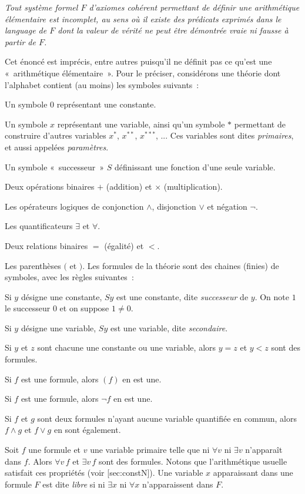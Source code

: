 \medskip

\noindent \emph{Tout système formel $F$ d'axiomes cohérent permettant de définir une arithmétique élémentaire est incomplet, au sens où il existe des prédicats exprimés dans le language de $F$ dont la valeur de vérité ne peut être démontrée vraie ni fausse à partir de $F$.}

\medskip

\noindent Cet énoncé est imprécis, entre autres puisqu'il ne définit pas ce qu'est une « arithmétique élémentaire ». 
Pour le préciser, considérons une théorie dont l'alphabet contient (au moins) les symboles suivants : 
\startitemize[nowhite]
  \item Un symbole $0$ représentant une constante. 
  \item Un symbole $x$ représentant une variable, ainsi qu'un symbole $\ast$ permettant de construire d'autres variables $x^\ast$, $x^{\ast\ast}$, $x^{\ast\ast\ast}$, ... Ces variables sont dites \emph{primaires}, et aussi appelées \emph{paramètres}.
  \item Un symbole « successeur » $S$ définissant une fonction d'une seule variable. 
  \item Deux opérations binaires $+$ (addition) et $\times$ (multiplication).
  \item Les opérateurs logiques de conjonction $\wedge$, disjonction $\vee$ et négation $\lnot$.
  \item Les quantificateurs $\exists$ et $\forall$. 
  \item Deux relations binaires $=$ (égalité) et $<$.
  \item Les parenthèses $($ et $)$.
\stopitemize
\blank[medium]
Les formules de la théorie sont des chaines (finies) de symboles, avec les règles suivantes : 
\startitemize[nowhite]
  \item Si $y$ désigne une constante, $S y$ est une constante, dite \emph{successeur} de $y$. 
      On note $1$ le successeur $0$ et on suppose $1 \neq 0$.
  \item Si $y$ désigne une variable, $S y$ est une variable, dite \emph{secondaire}.
  \item Si $y$ et $z$ sont chacune une constante ou une variable, alors $y = z$ et $y < z$ sont des formules.
  \item Si $f$ est une formule, alors $(f)$ en est une. 
  \item Si $f$ est une formule, alors $\lnot f$ en est une. 
  \item Si $f$ et $g$ sont deux formules n'ayant aucune variable quantifiée en commun, alors $f \wedge g$ et $f \vee g$ en sont également. 
  \item Soit $f$ une formule et $v$ une variable primaire telle que ni $\forall v$ ni $\exists v$ n'apparaît dans $f$. 
    Alors $\forall v \, f$ et $\exists v \, f$ sont des formules.
\stopitemize
Notons que l'arithmétique usuelle satisfait ces propriétés (voir [sec:constN]).
Une variable $x$ apparaissant dans une formule $F$ est dite \emph{libre} si ni $\exists x$ ni $\forall x$ n'apparaissent dans $F$.

